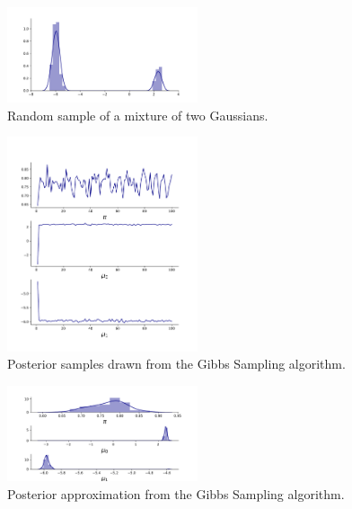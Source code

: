 \documentclass{article}
\begin{document}
\begin{figure}[!h]
    \includegraphics[width=0.5\textwidth]{img/gaussian_mixture.pdf} 
    \caption{Random sample of a mixture of two Gaussians.}
\end{figure}

\begin{figure}[!h]
    \includegraphics[width=0.5\textwidth]{img/gibbs_sampling_walk.pdf} 
    \caption{Posterior samples drawn from the Gibbs Sampling algorithm.}
\end{figure}

\begin{figure}[!h]
    \includegraphics[width=0.5\textwidth]{img/gibbs_sampling_density.pdf} 
    \caption{Posterior approximation from the Gibbs Sampling algorithm.}
\end{figure}
\end{document}
